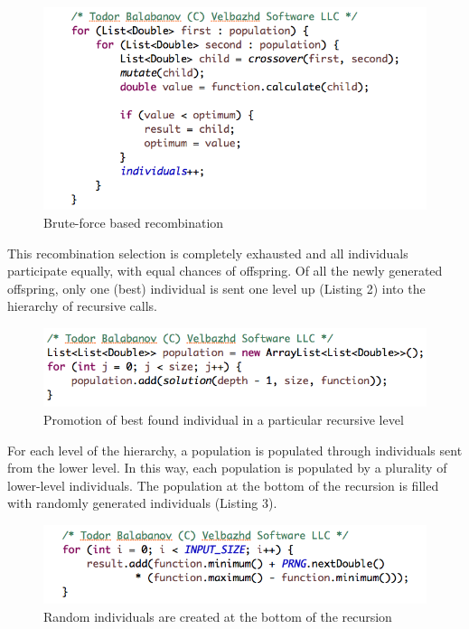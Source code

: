 \documentclass[graybox]{styles/svmult}
\begin{document}
\begin{figure}[b]
\sidecaption
\includegraphics[width=1.0\textwidth]{images/fig09}
\caption{Brute-force based recombination}
\label{fig:1}
\end{figure}

This recombination selection is completely exhausted and all individuals participate equally, with equal chances of offspring. Of all the newly generated offspring, only one (best) individual is sent one level up (Listing 2) into the hierarchy of recursive calls.

\begin{figure}[b]
\sidecaption
\includegraphics[width=1.0\textwidth]{images/fig10}
\caption{Promotion of best found individual in a particular recursive level}
\label{fig:2}
\end{figure}

For each level of the hierarchy, a population is populated through individuals sent from the lower level. In this way, each population is populated by a plurality of lower-level individuals. The population at the bottom of the recursion is filled with randomly generated individuals (Listing 3).

\begin{figure}[b]
\sidecaption
\includegraphics[width=1.0\textwidth]{images/fig11}
\caption{Random individuals are created at the bottom of the recursion}
\label{fig:3}
\end{figure}
\end{document}
